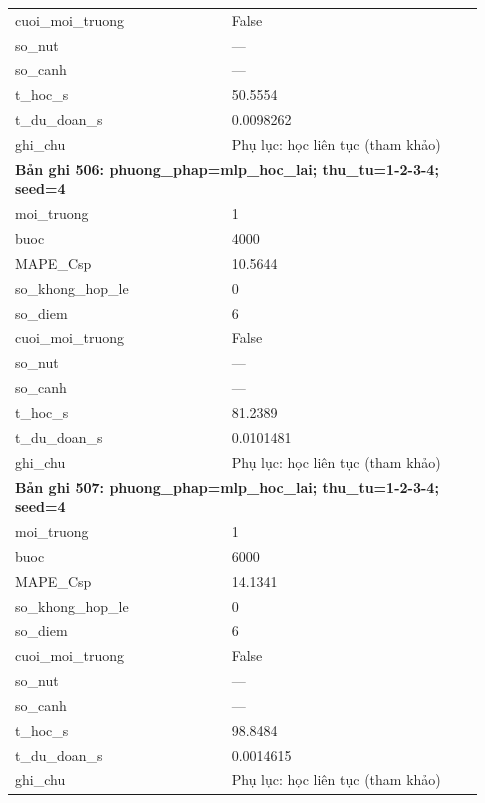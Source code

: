 \begin{longtable}{p{0.43\linewidth}p{0.50\linewidth}}
cuoi\_\allowbreak moi\_\allowbreak truong & False \\
so\_\allowbreak nut & — \\
so\_\allowbreak canh & — \\
t\_\allowbreak hoc\_\allowbreak s & 50.5554 \\
t\_\allowbreak du\_\allowbreak doan\_\allowbreak s & 0.0098262 \\
ghi\_\allowbreak chu & Phụ lục: học liên tục (tham khảo) \\
\midrule
\multicolumn{2}{p{0.95\linewidth}}{\textbf{Bản ghi 506: phuong\_phap=mlp\_hoc\_lai; thu\_tu=1-2-3-4; seed=4}} \\
moi\_\allowbreak truong & 1 \\
buoc & 4000 \\
MAPE\_\allowbreak Csp & 10.5644 \\
so\_\allowbreak khong\_\allowbreak hop\_\allowbreak le & 0 \\
so\_\allowbreak diem & 6 \\
cuoi\_\allowbreak moi\_\allowbreak truong & False \\
so\_\allowbreak nut & — \\
so\_\allowbreak canh & — \\
t\_\allowbreak hoc\_\allowbreak s & 81.2389 \\
t\_\allowbreak du\_\allowbreak doan\_\allowbreak s & 0.0101481 \\
ghi\_\allowbreak chu & Phụ lục: học liên tục (tham khảo) \\
\midrule
\multicolumn{2}{p{0.95\linewidth}}{\textbf{Bản ghi 507: phuong\_phap=mlp\_hoc\_lai; thu\_tu=1-2-3-4; seed=4}} \\
moi\_\allowbreak truong & 1 \\
buoc & 6000 \\
MAPE\_\allowbreak Csp & 14.1341 \\
so\_\allowbreak khong\_\allowbreak hop\_\allowbreak le & 0 \\
so\_\allowbreak diem & 6 \\
cuoi\_\allowbreak moi\_\allowbreak truong & False \\
so\_\allowbreak nut & — \\
so\_\allowbreak canh & — \\
t\_\allowbreak hoc\_\allowbreak s & 98.8484 \\
t\_\allowbreak du\_\allowbreak doan\_\allowbreak s & 0.0014615 \\
ghi\_\allowbreak chu & Phụ lục: học liên tục (tham khảo) \\

\end{longtable}
